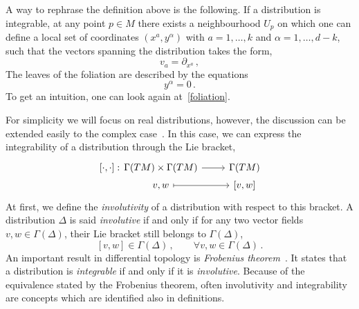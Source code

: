 \documentclass[debug]{phd}
\begin{document}
					A way to rephrase the definition above is the following.
					If a distribution is integrable, at any point $p \in M$ there exists a neighbourhood $U_p$ on which one can define a local set of coordinates $(x^a, y^\alpha)$ with $a=1,\ldots, k$ and $\alpha = 1, \ldots, d-k$, such that the vectors spanning the distribution takes the form,
							\begin{equation}
								v_a = \partial_{x^a}\, ,
							\end{equation}
					The leaves of the foliation are described by the equations
							\begin{equation}
								y^\alpha = 0 \, .
							\end{equation}
					To get an intuition, one can look again at~\cref{foliation}.
					
					For simplicity we will focus on real distributions, however, the discussion can be extended easily to the complex case~\cite{LawsFoli}.
					In this case, we can express the integrability of a distribution through the Lie bracket,
							\begin{equation}
								\begin{tikzcd}[row sep=.3mm]
										[\cdot, \cdot] :\!\!\!\!\!\!\!\!\!\!\!\!\!\!\!\!\! & \Gamma(TM) \times \Gamma(TM) \arrow{r} & \Gamma(TM) \\
 									& v, w \arrow[mapsto]{r} & \left[ v, w \right]
								\end{tikzcd}
							\end{equation}
					At first, we define the \emph{involutivity} of a distribution with respect to this bracket.
					A distribution $\Delta$ is said \emph{involutive} if and only if for any two vector fields $v,w \in \Gamma(\Delta)$, their Lie bracket still belongs to $\Gamma(\Delta)$,
							\begin{equation}
								\left[v, w \right] \in \Gamma(\Delta) \, ,  \qquad \forall v, w \in \Gamma(\Delta) \, .  
							\end{equation}
					An important result in differential topology is \emph{Frobenius theorem}~\cite{LawsFoli}. 
					It states that a distribution is \emph{integrable} if and only if it is \emph{involutive}.
					Because of the equivalence stated by the Frobenius theorem, often involutivity and integrability are concepts which are identified also in definitions.
					
\end{document}
